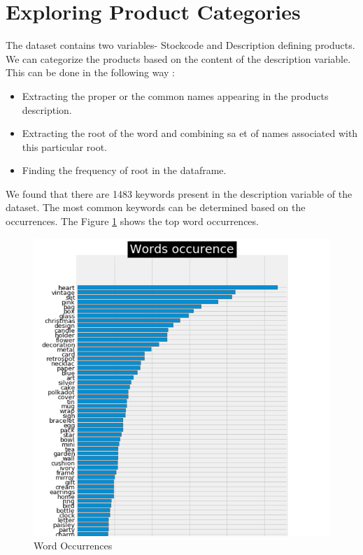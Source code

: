 \section{Exploring Product Categories}

The dataset contains two variables- Stockcode and Description defining products. We can categorize the products based on the content of the description variable. This can be done in the following way :\\

\begin{itemize}
  \item Extracting the proper or the common names appearing in the products description.
  \item Extracting the root of the word and combining sa et of names associated with this particular root.
  \item Finding the frequency of root in the dataframe.
 \end{itemize}
 
 We found that there are 1483 keywords present in the description variable of the dataset. The most common keywords can be determined based on the occurrences. The Figure \ref{3.1} shows the top word occurrences.
 
 \begin{figure}
\caption{Word Occurrences}
\label{3.1}
\centering
\includegraphics[width=\columnwidth]{images/3_1.PNG}
\end{figure}

